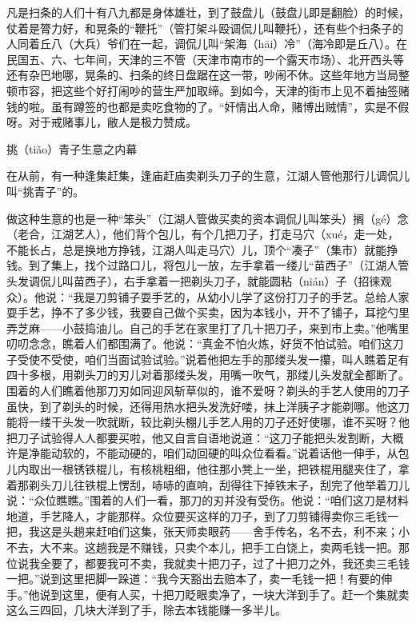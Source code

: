 \documentclass[12pt,UTF8]{ctexbook}
\begin{document}
凡是扫条的人们十有八九都是身体雄壮，到了鼓盘儿（鼓盘儿即是翻脸）的时候，仗着是膂力好，和晃条的“鞭托”（管打架斗殴调侃儿叫鞭托），还有些个扫条子的人同着丘八（大兵）爷们在一起，调侃儿叫“架海（hāi）冷”（海冷即是丘八）。在民国五、六、七年间，天津的三不管（天津市南市的一个露天市场）、北开西头等还有杂巴地哪，晃条的、扫条的终日盘踞在这一带，吵闹不休。这些年地方当局整顿市容，把这些个好打闹吵的营生严加取缔。到如今，天津的街市上见不着抽签赌钱的啦。虽有蹲签的也都是卖吃食物的了。“奸情出人命，赌博出贼情”，实是不假呀。对于戒赌事儿，敝人是极力赞成。





挑（tiǎo）青子生意之内幕


在从前，有一种逢集赶集，逢庙赶庙卖剃头刀子的生意，江湖人管他那行儿调侃儿叫“挑青子”的。

做这种生意的也是一种“笨头”（江湖人管做买卖的资本调侃儿叫笨头）搁（gé）念（老合，江湖艺人），他们背个包儿，有个几把刀子，打走马穴（xué，走一处，不能长占，总是换地方挣钱，江湖人叫走马穴）儿，顶个“凑子”（集市）就能挣钱。到了集上，找个过路口儿，将包儿一放，左手拿着一缕儿“苗西子”（江湖人管头发调侃儿叫苗西子），右手拿着一把剃头刀子，就能圆粘（nián）子（招徕观众）。他说：“我是刀剪铺子耍手艺的，从幼小儿学了这份打刀子的手艺。总给人家耍手艺，挣不了多少钱，我要自己做个买卖，因为本钱小，开不了铺子，耳挖勺里弄芝麻——小鼓捣油儿。自己的手艺在家里打了几十把刀子，来到市上卖。”他嘴里叨叨念念，瞧着人们都围满了。他说：“真金不怕火炼，好货不怕试验。咱们这刀子受使不受使，咱们当面试验试验。”说着他把左手的那缕头发一攥，叫人瞧着足有四十多根，用剃头刀的刃儿对着那缕头发，用嘴一吹气，那缕儿头发就全都断了。围着的人们瞧着他那刀刃如同迎风斩草似的，谁不爱呀？剃头的手艺人使用的刀子虽快，到了剃头的时候，还得用热水把头发洗好喽，抹上洋胰子才能剃哪。他这刀能将一缕干头发一吹就断，较比剃头棚儿手艺人用的刀子还好使哪，谁不买呀？他把刀子试验得人人都要买啦，他又自言自语地说道：“这刀子能把头发割断，大概许是净能动软的，不能动硬的，咱们动回硬的叫众位看看。”说着话他一伸手，从包儿内取出一根锈铁棍儿，有核桃粗细，他往那小凳上一坐，把铁棍用腿夹住了，拿着那剃头刀儿往铁棍上愣刮，哧哧的直响，刮得往下掉铁末子，刮完了他举着刀儿说：“众位瞧瞧。”围着的人们一看，那刀的刃并没有受伤。他说：“咱们这刀是材料地道，手艺降人，才能那样。众位要买这样的刀子，到了刀剪铺得卖你三毛钱一把，我这是头趟来赶咱们这集，张天师卖眼药——舍手传名，名不去，利不来；小不去，大不来。这趟我是不赚钱，只卖个本儿，把手工白饶上，卖两毛钱一把。那位说我全要了，都要我可不卖，我就卖十把刀子，过了十把刀之外，我还卖三毛钱一把。”说到这里把脚一跺道：“我今天豁出去赔本了，卖一毛钱一把！有要的伸手。”他说到这里，便有人买，十把刀眨眼卖净了，一块大洋到手了。赶一个集就卖这么三四回，几块大洋到了手，除去本钱能赚一多半儿。
\end{document}
